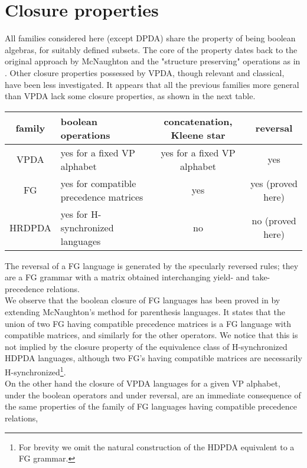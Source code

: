 \documentclass[3p,11pt]{elsarticle}
\begin{document}
\section{Closure properties}
All families considered here (except DPDA) share the property of being boolean algebras, for suitably defined subsets.  The core of the property dates back to the original approach by McNaughton and the "structure preserving" operations as in \cite{Crespi-ReghizziMM1978}. Other closure properties possessed by VPDA, though relevant and classical, have been less investigated. It appears that all the previous families more general than VPDA lack  some closure properties, as shown in the next table.
\begin{center}
\begin{tabular}{|c||p{4cm}|c|c|}\hline
   family  & boolean operations & concatenation, Kleene star & reversal  \\
  \hline\hline
  VPDA \cite{AluMad04}& yes for a fixed VP alphabet & yes for a fixed VP alphabet & yes \\ \hline
  FG & yes for compatible precedence matrices \cite{Crespi-ReghizziMM1978}& yes & yes (proved here) \\\hline
  HRDPDA & yes for H-synchronized languages \cite{conf/mfcs/NowotkaS07} & no \cite{caucal:DSP:2008:1743} & no (proved here)  \\
  \hline
\end{tabular}
\end{center}
The reversal of a FG language is generated by the specularly reversed rules; they are a FG grammar with a matrix obtained interchanging yield- and take-precedence relations.
\\
We observe that the boolean closure of  FG languages has been  proved in \cite{Crespi-ReghizziMM1978} by extending McNaughton's method for parenthesis languages. It states that the union of two FG having compatible precedence matrices is a FG language with compatible matrices, and similarly for the other operators. We notice that this is not implied by  the closure property \cite{conf/mfcs/NowotkaS07} of the equivalence class of H-synchronized HDPDA languages, although  two FG's having compatible matrices are necessarily H-synchronized\footnote{For brevity we omit the natural construction of the HDPDA equivalent to a FG grammar.}.
\\
On the other hand the closure of VPDA languages for a given VP alphabet, under the boolean operators and under reversal, are an immediate consequence of the same properties of the family of FG languages having compatible precedence relations,
\end{document}
